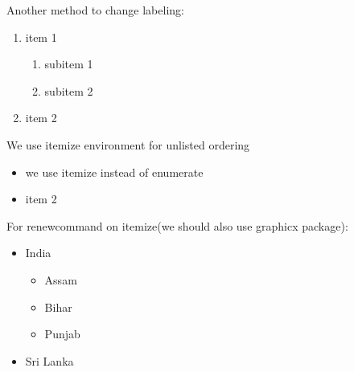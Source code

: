 \documentclass[12pt,a4paper]{article}
\begin{document}
Another method to change labeling:
\begin{enumerate}[{\bf Ex{a}mple 1:}]
    \item item 1
    \begin{enumerate}[{\bf problem(a):}]
        \item subitem 1
        \item subitem 2
    \end{enumerate}
    \item item 2
\end{enumerate}





We use itemize environment for unlisted ordering
\begin{itemize}
    \item we use itemize instead of enumerate
    \item item 2
\end{itemize}





For renewcommand on itemize(we should also use graphicx package):
\begin{itemize}
    \renewcommand{\labelitemi}{$\star$}
    \renewcommand{\labelitemii}{$\Rightarrow$}
    \item India
    \begin{itemize}
        \item Assam
        \item Bihar
        \item Punjab
    \end{itemize}
    \item Sri Lanka
\end{itemize}
\end{document}
